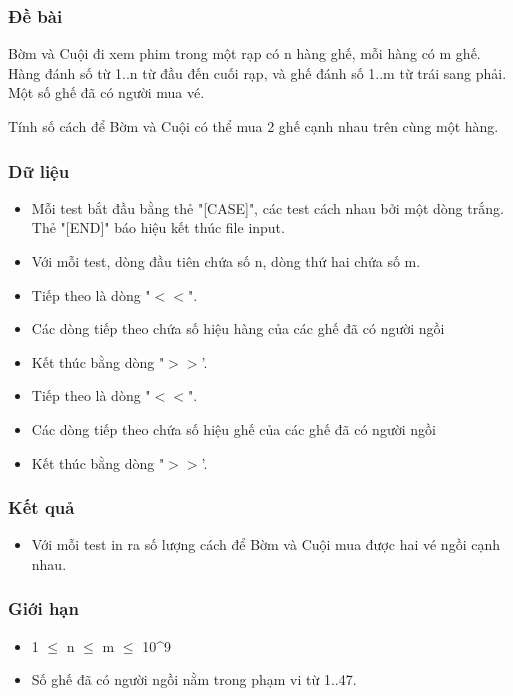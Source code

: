 



\subsubsection{   Đề bài  }

   Bờm và Cuội đi xem phim trong một rạp có n hàng ghế, mỗi hàng có m ghế. Hàng đánh số từ 1..n từ đầu đến cuối rạp, và ghế đánh số 1..m từ trái sang phải. Một số ghế đã có người mua vé.  

   Tính số cách để Bờm và Cuội có thể mua 2 ghế cạnh nhau trên cùng một hàng.  

\subsubsection{   Dữ liệu  }
\begin{itemize}
	\item     Mỗi test bắt đầu bằng thẻ "[CASE]", các test cách nhau bởi một dòng trắng. Thẻ "[END]" báo hiệu kết thúc file input.   
	\item     Với mỗi test, dòng đầu tiên chứa số n, dòng thứ hai chứa số m.   
	\item     Tiếp theo là dòng "$<$$<$".   
	\item     Các dòng tiếp theo chứa số hiệu hàng của các ghế đã có người ngồi   
	\item     Kết thúc bằng dòng "$>$$>$'.   
	\item     Tiếp theo là dòng "$<$$<$".   
	\item     Các dòng tiếp theo chứa số hiệu ghế của các ghế đã có người ngồi   
	\item     Kết thúc bằng dòng "$>$$>$'.   
\end{itemize}

\subsubsection{   Kết quả  }
\begin{itemize}
	\item     Với mỗi test in ra số lượng cách để Bờm và Cuội mua được hai vé ngồi cạnh nhau.   
\end{itemize}

\subsubsection{   Giới hạn  }
\begin{itemize}
	\item     1  $\le$  n  $\le$  m  $\le$  10\textasciicircum9   
	\item     Số ghế đã có người ngồi nằm trong phạm vi từ 1..47.   
\end{itemize}

